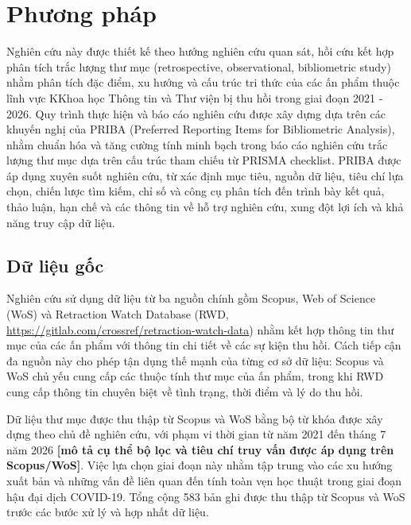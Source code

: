 \section{Phương pháp}

Nghiên cứu này được thiết kế theo hướng nghiên cứu quan sát, hồi cứu kết hợp phân tích trắc lượng thư mục (retrospective, observational, bibliometric study) nhằm phân tích đặc điểm, xu hướng và cấu trúc tri thức của các ấn phẩm thuộc lĩnh vực KKhoa học Thông tin và Thư viện bị thu hồi trong giai đoạn 2021 - 2026. Quy trình thực hiện và báo cáo nghiên cứu được xây dựng dựa trên các khuyến nghị của PRIBA (Preferred Reporting Items for Bibliometric Analysis), nhằm chuẩn hóa và tăng cường tính minh bạch trong báo cáo nghiên cứu trắc lượng thư mục dựa trên cấu trúc tham chiếu từ PRISMA checklist. PRIBA được áp dụng xuyên suốt nghiên cứu, từ xác định mục tiêu, nguồn dữ liệu, tiêu chí lựa chọn, chiến lược tìm kiếm, chỉ số và công cụ phân tích đến trình bày kết quả, thảo luận, hạn chế và các thông tin về hỗ trợ nghiên cứu, xung đột lợi ích và khả năng truy cập dữ liệu.

\subsection{Dữ liệu gốc}

Nghiên cứu sử dụng dữ liệu từ ba nguồn chính gồm Scopus, Web of Science (WoS) và Retraction Watch Database (RWD, \url{https://gitlab.com/crossref/retraction-watch-data}) nhằm kết hợp thông tin thư mục của các ấn phẩm với thông tin chi tiết về các sự kiện thu hồi. Cách tiếp cận đa nguồn này cho phép tận dụng thế mạnh của từng cơ sở dữ liệu: Scopus và WoS chủ yếu cung cấp các thuộc tính thư mục của ấn phẩm, trong khi RWD cung cấp thông tin chuyên biệt về tình trạng, thời điểm và lý do thu hồi.

Dữ liệu thư mục được thu thập từ Scopus và WoS bằng bộ từ khóa được xây dựng theo chủ đề nghiên cứu, với phạm vi thời gian từ năm 2021 đến tháng 7 năm 2026 \textbf{[mô tả cụ thể bộ lọc và tiêu chí truy vấn được áp dụng trên Scopus/WoS]}. Việc lựa chọn giai đoạn này nhằm tập trung vào các xu hướng xuất bản và những vấn đề liên quan đến tính toàn vẹn học thuật trong giai đoạn hậu đại dịch COVID-19. Tổng cộng 583 bản ghi được thu thập từ Scopus và WoS trước các bước xử lý và hợp nhất dữ liệu.

